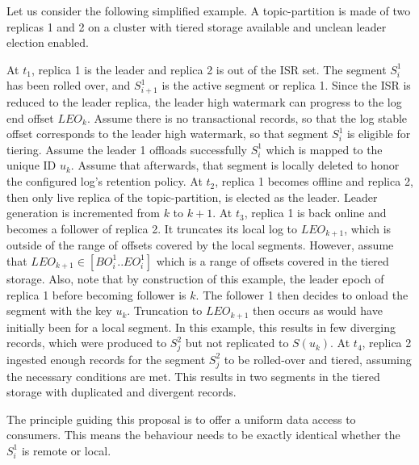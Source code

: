 \documentclass{article}
\begin{document}
Let us consider the following simplified example. A topic-partition is made of two replicas 1 and 2 on a cluster with tiered storage available and unclean leader election enabled. 

\begin{outline}[enumerate]
	\1 At $t_1$, replica 1 is the leader and replica 2 is out of the ISR set. The segment $S_i^1$ has been rolled over, and $S_{i+1}^1$ is the active segment or replica 1. Since the ISR is reduced to the leader replica, the leader high watermark can progress to the log end offset $LEO_k$. Assume there is no transactional records, so that the log stable offset corresponds to the leader high watermark, so that segment $S_i^1$ is eligible for tiering. Assume the leader 1 offloads successfully $S_i^1$ which is mapped to the unique ID $u_k$. Assume that afterwards, that segment is locally deleted to honor the configured log's retention policy.
	\1  At $t_2$, replica 1 becomes offline and replica 2, then only live replica of the topic-partition, is elected as the leader. Leader generation is incremented from $k$ to $k + 1$.
	\1  At $t_3$, replica 1 is back online and becomes a follower of replica 2. It truncates its local log to $LEO_{k+1}$, which is outside of the range of offsets covered by the local segments. However, assume that $LEO_{k+1} \in [BO_i^1..EO_i^1]$ which is a range of offsets covered in the tiered storage. Also, note that by construction of this example, the leader epoch of replica 1 before becoming follower is $k$. The follower 1 then decides to onload the segment with the key $u_k$. Truncation to $LEO_{k+1}$ then occurs as would have initially been for a local segment. In this example, this results in few diverging records, which were produced to $S_j^2$ but not replicated to $S(u_k)$.
	\1 At $t_4$, replica 2 ingested enough records for the segment $S_j^2$ to be rolled-over and tiered, assuming the necessary conditions are met. This results in two segments in the tiered storage with duplicated and divergent records.
\end{outline}

The principle guiding this proposal is to offer a uniform data access to consumers. This means the behaviour needs to be exactly identical whether the $S_i^1$ is remote or local.
\end{document}
